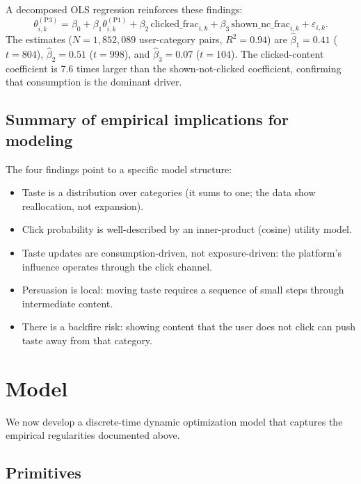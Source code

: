 \documentclass[11pt]{article}
\begin{document}
A decomposed OLS regression reinforces these findings:
\[
\theta_{i,k}^{(\text{P3})} = \beta_0 + \beta_1 \theta_{i,k}^{(\text{P1})} + \beta_2 \, \text{clicked\_frac}_{i,k} + \beta_3 \, \text{shown\_nc\_frac}_{i,k} + \varepsilon_{i,k}.
\]
The estimates ($N = 1{,}852{,}089$ user-category pairs, $R^2 = 0.94$) are $\hat{\beta}_1 = 0.41$ ($t = 804$), $\hat{\beta}_2 = 0.51$ ($t = 998$), and $\hat{\beta}_3 = 0.07$ ($t = 104$). The clicked-content coefficient is 7.6 times larger than the shown-not-clicked coefficient, confirming that consumption is the dominant driver.

\subsection{Summary of empirical implications for modeling}

The four findings point to a specific model structure:
\begin{itemize}[leftmargin=1.5em, itemsep=0.2em]
\item Taste is a distribution over categories (it sums to one; the data show reallocation, not expansion).
\item Click probability is well-described by an inner-product (cosine) utility model.
\item Taste updates are consumption-driven, not exposure-driven: the platform's influence operates through the click channel.
\item Persuasion is local: moving taste requires a sequence of small steps through intermediate content.
\item There is a backfire risk: showing content that the user does not click can push taste away from that category.
\end{itemize}

\section{Model}
\label{sec:model}

We now develop a discrete-time dynamic optimization model that captures the empirical regularities documented above.

\subsection{Primitives}
\end{document}
